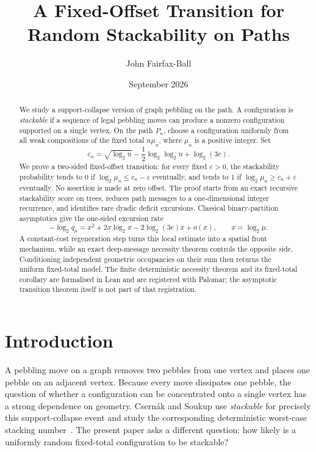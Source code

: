 \documentclass[11pt]{article}
\title{A Fixed-Offset Transition for Random Stackability on Paths}
\author{John Fairfax-Ball}
\date{September 2026}
\newcommand{\eps}{\varepsilon}
\begin{document}
\maketitle

\begin{abstract}
We study a support-collapse version of graph pebbling on the path.  A
configuration is \emph{stackable} if a sequence of legal pebbling moves can
produce a nonzero configuration supported on a single vertex.  On the path
$P_n$, choose a configuration uniformly from all weak compositions of the
fixed total $n\mu_n$, where $\mu_n$ is a positive integer.  Set
\[
 c_n=\sqrt{\log_2 n}-\frac12\log_2\log_2 n+\log_2(3e).
\]
We prove a two-sided fixed-offset transition: for every fixed $\eps>0$, the
stackability probability tends to $0$ if
$\log_2\mu_n\le c_n-\eps$ eventually, and tends to $1$ if
$\log_2\mu_n\ge c_n+\eps$ eventually.  No assertion is made at zero offset.
The proof starts from an exact recursive stackability score on trees, reduces
path messages to a one-dimensional integer recurrence, and identifies rare
dyadic deficit excursions.  Classical binary-partition asymptotics give the
one-sided excursion rate
\[
 -\log_2 q_\mu
 =x^2+2x\log_2x-2\log_2(3e)x+o(x),\qquad x=\log_2\mu.
\]
A constant-cost regeneration step turns this local estimate into a spatial
front mechanism, while an exact deep-message necessity theorem controls the
opposite side.  Conditioning independent geometric occupancies on their sum
then returns the uniform fixed-total model.  The finite deterministic
necessity theorem and its fixed-total corollary are formalised in Lean and are
registered with Palomar; the asymptotic transition theorem itself is not part
of that registration.
\end{abstract}

\section{Introduction}

A pebbling move on a graph removes two pebbles from one vertex and places one
pebble on an adjacent vertex.  Because every move dissipates one pebble, the
question of whether a configuration can be concentrated onto a single vertex
has a strong dependence on geometry.  Csern\'ak and Soukup use
\emph{stackable} for precisely this support-collapse event and study the
corresponding deterministic worst-case stacking number~\cite{CsernakSoukup2026}.
The present paper asks a different question: how likely is a uniformly random
fixed-total configuration to be stackable?
\end{document}
